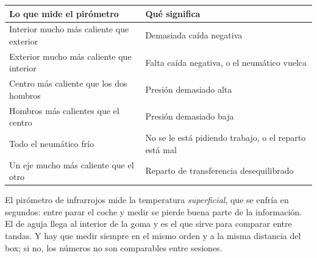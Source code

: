 \begin{center}
\begin{tabularx}{\textwidth}{@{}lX@{}}
\toprule
\textbf{Lo que mide el pirómetro} & \textbf{Qué significa} \\
\midrule
Interior mucho más caliente que exterior & Demasiada caída negativa \\
Exterior mucho más caliente que interior & Falta caída negativa, o el neumático vuelca \\
Centro más caliente que los dos hombros & Presión demasiado alta \\
Hombros más calientes que el centro & Presión demasiado baja \\
Todo el neumático frío & No se le está pidiendo trabajo, o el reparto está mal \\
Un eje mucho más caliente que el otro & Reparto de transferencia desequilibrado \\
\bottomrule
\end{tabularx}
\end{center}

\begin{ojo}
El pirómetro de infrarrojos mide la temperatura \emph{superficial}, que se enfría
en segundos: entre parar el coche y medir se pierde buena parte de la
información. El de aguja llega al interior de la goma y es el que sirve para
comparar entre tandas. Y hay que medir siempre en el mismo orden y a la misma
distancia del box; si no, los números no son comparables entre sesiones.
\end{ojo}

